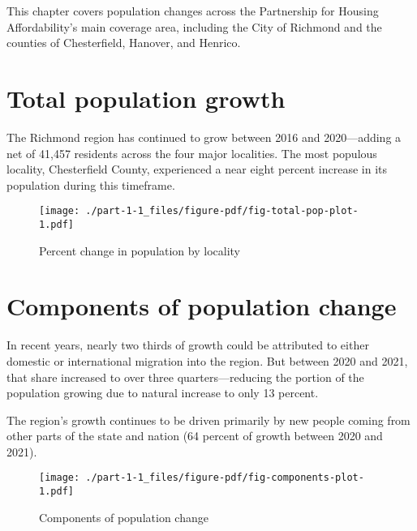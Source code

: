 \documentclass[
  letterpaper,
  DIV=11,
  numbers=noendperiod]{scrreprt}
\begin{document}
This chapter covers population changes across the Partnership for
Housing Affordability's main coverage area, including the City of
Richmond and the counties of Chesterfield, Hanover, and Henrico.

\hypertarget{total-population-growth}{%
\section{Total population growth}\label{total-population-growth}}

The Richmond region has continued to grow between 2016 and 2020---adding
a net of 41,457 residents across the four major localities. The most
populous locality, Chesterfield County, experienced a near eight percent
increase in its population during this timeframe.

\begin{figure}

{\centering \texttt{[image: ./part-1-1\_files/figure-pdf/fig-total-pop-plot-1.pdf]}

}

\caption{\label{fig-total-pop-plot}Percent change in population by
locality}

\end{figure}

\hypertarget{components-of-population-change}{%
\section{Components of population
change}\label{components-of-population-change}}

In recent years, nearly two thirds of growth could be attributed to
either domestic or international migration into the region. But between
2020 and 2021, that share increased to over three quarters---reducing
the portion of the population growing due to natural increase to only 13
percent.

The region's growth continues to be driven primarily by new people
coming from other parts of the state and nation (64 percent of growth
between 2020 and 2021).

\begin{figure}

{\centering \texttt{[image: ./part-1-1\_files/figure-pdf/fig-components-plot-1.pdf]}

}

\caption{\label{fig-components-plot}Components of population change}

\end{figure}
\end{document}
